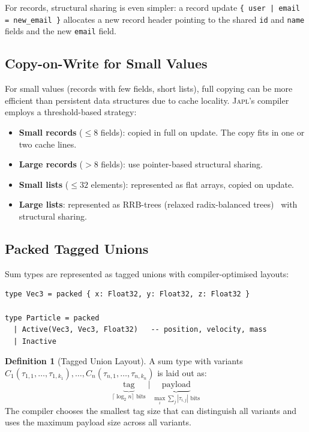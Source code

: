 \documentclass[11pt]{article}
\theoremstyle{definition}
\newtheorem{definition}[theorem]{Definition}
\theoremstyle{remark}
\newcommand{\japl}{\textsc{Japl}}
\begin{document}
For records, structural sharing is even simpler: a record update
\texttt{\{ user | email = new\_email \}} allocates a new record
header pointing to the shared \texttt{id} and \texttt{name} fields
and the new \texttt{email} field.

\subsection{Copy-on-Write for Small Values}
\label{sec:implementation:cow}

For small values (records with few fields, short lists), full copying
can be more efficient than persistent data structures due to cache
locality.  \japl{}'s compiler employs a threshold-based strategy:

\begin{itemize}
  \item \textbf{Small records} ($\leq 8$ fields): copied in full on
    update.  The copy fits in one or two cache lines.
  \item \textbf{Large records} ($> 8$ fields): use pointer-based
    structural sharing.
  \item \textbf{Small lists} ($\leq 32$ elements): represented as
    flat arrays, copied on update.
  \item \textbf{Large lists}: represented as RRB-trees (relaxed
    radix-balanced trees)~\cite{stucki2015rrb} with structural
    sharing.
\end{itemize}

\subsection{Packed Tagged Unions}
\label{sec:implementation:tagged-unions}

Sum types are represented as tagged unions with compiler-optimised
layouts:

\begin{lstlisting}[caption={Packed representation for small unions.}]
type Vec3 = packed { x: Float32, y: Float32, z: Float32 }

type Particle = packed
  | Active(Vec3, Vec3, Float32)   -- position, velocity, mass
  | Inactive
\end{lstlisting}

\begin{definition}[Tagged Union Layout]
\label{def:tagged-layout}
A sum type with variants $C_1(\tau_{1,1}, \ldots, \tau_{1,k_1}),
\ldots, C_n(\tau_{n,1}, \ldots, \tau_{n,k_n})$ is laid out as:
\[
  \underbrace{\text{tag}}_{\lceil \log_2 n \rceil \text{ bits}}
  \;\Big|\;
  \underbrace{\text{payload}}_{\max_i \sum_j |\tau_{i,j}| \text{ bits}}
\]
The compiler chooses the smallest tag size that can distinguish all
variants and uses the maximum payload size across all variants.
\end{definition}
\end{document}
